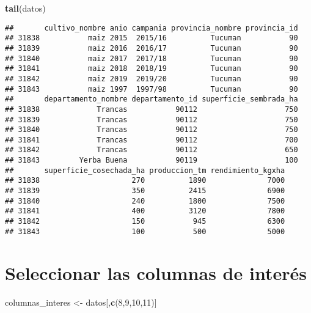 \documentclass[
]{article}
\newenvironment{Shaded}{\begin{snugshade}}{\end{snugshade}}
\newcommand{\DecValTok}[1]{\textcolor[rgb]{0.00,0.00,0.81}{#1}}
\newcommand{\FunctionTok}[1]{\textcolor[rgb]{0.13,0.29,0.53}{\textbf{#1}}}
\newcommand{\NormalTok}[1]{#1}
\newcommand{\OtherTok}[1]{\textcolor[rgb]{0.56,0.35,0.01}{#1}}
\begin{document}
\begin{Shaded}
\begin{Highlighting}[]
\FunctionTok{tail}\NormalTok{(datos)}
\end{Highlighting}
\end{Shaded}

\begin{verbatim}
##       cultivo_nombre anio campania provincia_nombre provincia_id
## 31838           maiz 2015  2015/16          Tucuman           90
## 31839           maiz 2016  2016/17          Tucuman           90
## 31840           maiz 2017  2017/18          Tucuman           90
## 31841           maiz 2018  2018/19          Tucuman           90
## 31842           maiz 2019  2019/20          Tucuman           90
## 31843           maiz 1997  1997/98          Tucuman           90
##       departamento_nombre departamento_id superficie_sembrada_ha
## 31838             Trancas           90112                    750
## 31839             Trancas           90112                    750
## 31840             Trancas           90112                    750
## 31841             Trancas           90112                    700
## 31842             Trancas           90112                    650
## 31843         Yerba Buena           90119                    100
##       superficie_cosechada_ha produccion_tm rendimiento_kgxha
## 31838                     270          1890              7000
## 31839                     350          2415              6900
## 31840                     240          1800              7500
## 31841                     400          3120              7800
## 31842                     150           945              6300
## 31843                     100           500              5000
\end{verbatim}

\hypertarget{seleccionar-las-columnas-de-interuxe9s}{%
\section{Seleccionar las columnas de
interés}\label{seleccionar-las-columnas-de-interuxe9s}}

\begin{Shaded}
\begin{Highlighting}[]
\NormalTok{columnas\_interes }\OtherTok{\textless{}{-}}\NormalTok{ datos[,}\FunctionTok{c}\NormalTok{(}\DecValTok{8}\NormalTok{,}\DecValTok{9}\NormalTok{,}\DecValTok{10}\NormalTok{,}\DecValTok{11}\NormalTok{)]}
\end{Highlighting}
\end{Shaded}
\end{document}
